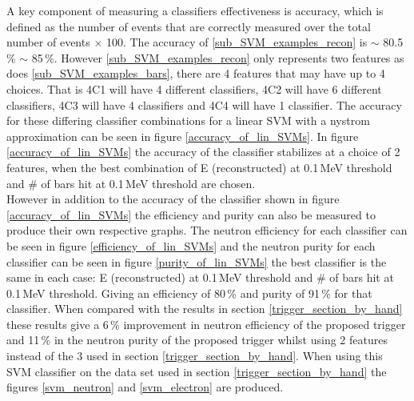\documentclass[12pt,a4paper]{article}
\begin{document}
A key component of measuring a classifiers effectiveness is accuracy, which is defined as the number of events that are correctly measured over the total number of events $\times$ 100. The accuracy of \ref{sub_SVM_examples_recon} is $\sim$  80.5\,\% $\sim$ 85\,\%. However \ref{sub_SVM_examples_recon} only represents two features as does \ref{sub_SVM_examples_bars}, there are 4 features that may have up to 4 choices. That is 4C1 will have 4 different classifiers, 4C2 will have 6 different classifiers, 4C3 will have 4 classifiers and 4C4 will have 1 classifier. The accuracy for these differing classifier combinations for a linear SVM with a nystrom approximation can be seen in figure \ref{accuracy_of_lin_SVMs}. In figure \ref{accuracy_of_lin_SVMs} the accuracy of the classifier stabilizes at a choice of 2 features, when the best combination of E (reconstructed) at 0.1\,MeV threshold and \# of bars hit at 0.1\,MeV threshold are chosen.\\ 

However in addition to the accuracy of the classifier shown in figure \ref{accuracy_of_lin_SVMs} the efficiency and purity can also be measured to produce their own respective graphs. The neutron efficiency for each classifier can be seen in figure \ref{efficiency_of_lin_SVMs} and the neutron purity for each classifier can be seen in figure \ref{purity_of_lin_SVMs} the best classifier is the same in each case: E (reconstructed) at 0.1\,MeV threshold and \# of bars hit at 0.1\,MeV threshold. Giving an efficiency of 80\,\% and purity of 91\,\% for that classifier. When compared with the results in section \ref{trigger_section_by_hand} these results give a 6\,\% improvement in neutron efficiency of the proposed trigger and 11\,\% in the neutron purity of the proposed trigger whilst using 2 features instead of the 3 used in section \ref{trigger_section_by_hand}. When using this SVM classifier on the data set used in section \ref{trigger_section_by_hand} the figures \ref{svm_neutron} and \ref{svm_electron} are produced. 
\end{document}
